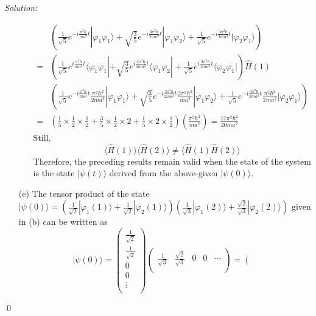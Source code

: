 \documentclass[12pt,a4paper]{article}
\newenvironment{sol}
    {\emph{Solution:}
    }
    {
    \qed
    }
\begin{document}
\begin{sol}
\begin{itemize}
\begin{itemize}
\begin{align}
\nonumber&\left(\frac{1}{\sqrt{5}}e^{-i\frac{\pi^2\hbar}{ma^2}t}|\varphi_1\varphi_1\rangle+\sqrt{\frac{3}{5}}e^{-i\frac{3\pi^2\hbar}{2ma^2}t}|\varphi_1\varphi_2\rangle+\frac{1}{\sqrt{5}}e^{-i\frac{3\pi^2\hbar}{2ma^2}t}|\varphi_2\varphi_1\rangle\right)\\
\nonumber=&\left(\frac{1}{\sqrt{5}}e^{i\frac{\pi^2\hbar}{ma^2}t}\langle\varphi_1\varphi_1|+\sqrt{\frac{3}{5}}e^{i\frac{3\pi^2\hbar}{2ma^2}t}\langle\varphi_1\varphi_2|+\frac{1}{\sqrt{5}}e^{i\frac{3\pi^2\hbar}{2ma^2}t}\langle\varphi_2\varphi_1|\right)\hat{H}(1)\\
\nonumber&\left(\frac{1}{\sqrt{5}}e^{-i\frac{\pi^2\hbar}{ma^2}t}\frac{\pi^2\hbar^2}{2ma^2}|\varphi_1\varphi_1\rangle+\sqrt{\frac{3}{5}}e^{-i\frac{3\pi^2\hbar}{2ma^2}t}\frac{2\pi^2\hbar^2}{ma^2}|\varphi_1\varphi_2\rangle+\frac{1}{\sqrt{5}}e^{-i\frac{3\pi^2\hbar}{2ma^2}t}\frac{\pi^2\hbar^2}{2ma^2}|\varphi_2\varphi_1\rangle\right)\\
=&\left(\frac{1}{5}\times\frac{1}{2}\times\frac{1}{2}+\frac{3}{5}\times\frac{1}{2}\times2+\frac{1}{5}\times2\times\frac{1}{2}\right)\left(\frac{\pi^2\hbar^2}{ma^2}\right)=\frac{17\pi^2\hbar^2}{20ma^2}
\end{align}\normalsize
Still,
\begin{equation}
\langle\hat{H}(1)\rangle\langle\hat{H}(2)\rangle\neq\langle\hat{H}(1)\hat{H}(2)\rangle
\end{equation}
Therefore, the preceding results remain valid when the state of the system is the state $|\psi(t)\rangle$ derived from the above-given $|\psi(0)\rangle$.
\end{itemize}
\item[(e)] The tensor product of the state $|\psi(0)\rangle=\left(\frac{1}{\sqrt{2}}|\varphi_1(1)\rangle+\frac{1}{\sqrt{2}}|\varphi_2(1)\rangle\right)\left(\frac{1}{\sqrt{3}}|\varphi_1(2)\rangle+\frac{\sqrt{2}}{\sqrt{3}}|\varphi_2(2)\rangle\right)$ given in (b) can be written as
\begin{equation}
|\psi(0)\rangle=\left(\begin{array}{c}
\frac{1}{\sqrt{2}}\\
\frac{1}{\sqrt{2}}\\
0\\
0\\
\vdots\\
\end{array}\right)\left(\begin{array}{ccccc}
\frac{1}{\sqrt{3}}&\frac{\sqrt{2}}{\sqrt{3}}&0&0&\cdots\\
\end{array}\right)=\left(\begin{array}{ccccc}

\end{array}
\end{equation}
\end{itemize}
\end{sol}
\end{document}
